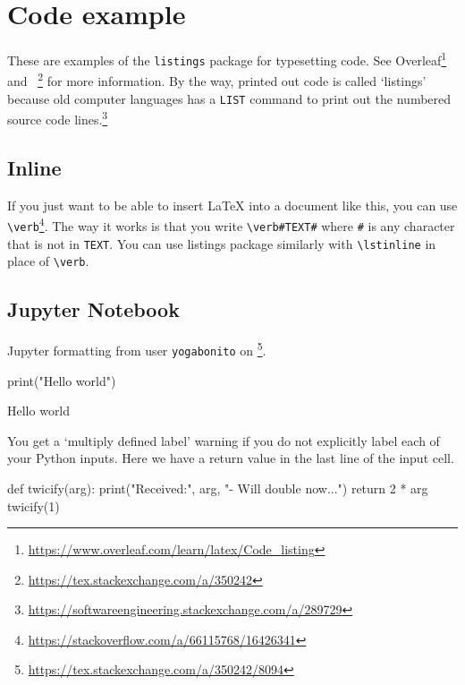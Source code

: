 
\section{Code example}

These are examples of the \texttt{listings} package for typesetting code. See Overleaf\footnote{\url{https://www.overleaf.com/learn/latex/Code_listing}} and ~\footnote{\url{https://tex.stackexchange.com/a/350242}} for more information. By the way, printed out code is called `listings' because old computer languages has a \texttt{LIST} command to print out the numbered source code lines.\footnote{\url{https://softwareengineering.stackexchange.com/a/289729}}

\subsection{Inline}

If you just want to be able to insert \LaTeX{} into a document like this, you can use \verb!\verb!\footnote{\url{https://stackoverflow.com/a/66115768/16426341}}. The way it works is that you write \verb!\verb#TEXT#! where \verb!#! is any character that is not in \texttt{TEXT}. You can use listings package similarly with \verb!\lstinline! in place of \verb!\verb!.


\subsection{Jupyter Notebook}

Jupyter formatting from user \texttt{yogabonito} on \footnote{\url{https://tex.stackexchange.com/a/350242/8094}}.

\begin{pyin}%
print("Hello world")
\end{pyin}
%  
\begin{pyprint}
Hello world
\end{pyprint}
% 
You get a `multiply defined label' warning if you do not explicitly label each of your Python inputs. 
% 
% 
Here we have a return value in the last line of the input cell.
\begin{pyin}[labelOfTheSecondInput]
def twicify(arg):
    print("Received:", arg, "- Will double now...")
    return 2 * arg
twicify(1)
\end{pyin}

